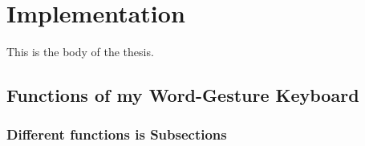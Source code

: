 \chapter{Implementation}

This is the body of the thesis.

\section{Functions of my Word-Gesture Keyboard}
\subsection{Different functions is Subsections}